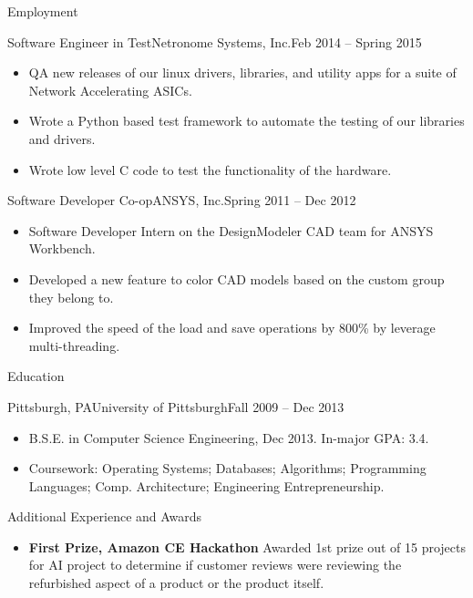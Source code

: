 \documentclass[]{mussocv}
\begin{document}
\begin{cvsection}{Employment}
		\begin{cvsubsection}{Software Engineer in Test}{Netronome Systems, Inc.}{Feb 2014 -- Spring 2015}
			\begin{itemize}
				\item QA new releases of our linux drivers, libraries, and utility apps for a suite of Network Accelerating ASICs.
				\item Wrote a Python based test framework to automate the testing of our libraries and drivers.
				\item Wrote low level C code to test the functionality of the hardware.
			\end{itemize}
		\end{cvsubsection}

		\begin{cvsubsection}{Software Developer Co-op}{ANSYS, Inc.}{Spring 2011 -- Dec 2012}
			\begin{itemize}
				\item Software Developer Intern on the DesignModeler CAD team for ANSYS Workbench. 
				\item Developed a new feature to color CAD models based on the custom group they belong to.
				\item Improved the speed of the load and save operations by 800\% by leverage multi-threading.
			\end{itemize}
		\end{cvsubsection}
	\end{cvsection}
	
	\begin{cvsection}{Education}
		\begin{cvsubsection}{Pittsburgh, PA}{University of Pittsburgh}{Fall 2009 -- Dec 2013}
			\begin{itemize}
				\item B.S.E. in Computer Science Engineering, Dec 2013.  In-major GPA: 3.4.
				\item Coursework: Operating Systems; Databases; Algorithms; Programming Languages; Comp. Architecture; Engineering Entrepreneurship.
			\end{itemize}
		\end{cvsubsection}
	\end{cvsection}
	
	\begin{cvsection}{Additional Experience and Awards}
		\begin{cvsubsection}{}{}{}	
			\begin{itemize}
				\item \textbf{First Prize, Amazon CE Hackathon} Awarded 1st prize out of 15 projects for AI project to determine if customer reviews were reviewing the refurbished aspect of a product or the product itself.
			\end{itemize}
		\end{cvsubsection}
	\end{cvsection}
	
\end{document}

